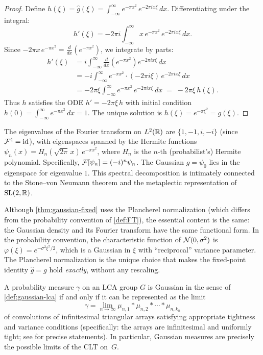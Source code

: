 \begin{proof}
Define $h(\xi) = \hat{g}(\xi) = \int_{-\infty}^{\infty} e^{-\pi x^2}\, e^{-2\pi i x\xi}\, dx$. Differentiating under the integral:
\[
h'(\xi) = -2\pi i \int_{-\infty}^{\infty} x\, e^{-\pi x^2}\, e^{-2\pi i x\xi}\, dx.
\]
Since $-2\pi x\, e^{-\pi x^2} = \frac{d}{dx}\!\left(e^{-\pi x^2}\right)$, we integrate by parts:
\begin{align*}
h'(\xi) &= i \int_{-\infty}^{\infty} \frac{d}{dx}\!\left(e^{-\pi x^2}\right) e^{-2\pi i x\xi}\, dx \\
&= -i \int_{-\infty}^{\infty} e^{-\pi x^2} \cdot (-2\pi i\xi)\, e^{-2\pi i x\xi}\, dx \\
&= -2\pi\xi \int_{-\infty}^{\infty} e^{-\pi x^2}\, e^{-2\pi i x\xi}\, dx \;=\; -2\pi\xi\, h(\xi).
\end{align*}
Thus $h$ satisfies the ODE $h' = -2\pi\xi\, h$ with initial condition $h(0) = \int_{-\infty}^{\infty} e^{-\pi x^2}\, dx = 1$. The unique solution is $h(\xi) = e^{-\pi\xi^2} = g(\xi)$.
\end{proof}

\begin{remark}\label{rmk:eigenvalues}
The eigenvalues of the Fourier transform on $L^2(\mathbb{R})$ are $\{1, -1, i, -i\}$ (since $\mathcal{F}^4 = \mathrm{id}$), with eigenspaces spanned by the Hermite functions $\psi_n(x) = H_n(\sqrt{2\pi}\, x)\, e^{-\pi x^2}$, where $H_n$ is the $n$-th (probabilist's) Hermite polynomial. Specifically, $\mathcal{F}[\psi_n] = (-i)^n \psi_n$. The Gaussian $g = \psi_0$ lies in the eigenspace for eigenvalue $1$. This spectral decomposition is intimately connected to the Stone--von Neumann theorem and the metaplectic representation of $\mathrm{SL}(2, \mathbb{R})$.
\end{remark}

\begin{remark}\label{rmk:convention-bridge}
Although \cref{thm:gaussian-fixed} uses the Plancherel normalization (which differs from the probability convention of \cref{def:FT}), the essential content is the same: the Gaussian density and its Fourier transform have the same functional form. In the probability convention, the characteristic function of $\mathcal{N}(0, \sigma^2)$ is $\varphi(\xi) = e^{-\sigma^2\xi^2/2}$, which is a Gaussian in $\xi$ with ``reciprocal'' variance parameter. The Plancherel normalization is the unique choice that makes the fixed-point identity $\hat{g} = g$ hold \emph{exactly}, without any rescaling.
\end{remark}

\begin{proposition}\label{prop:gaussian-characterization}
A probability measure $\gamma$ on an LCA group $G$ is Gaussian in the sense of \cref{def:gaussian-lca} if and only if it can be represented as the limit
\[
\gamma = \lim_{n \to \infty} \mu_{n,1} * \mu_{n,2} * \cdots * \mu_{n,k_n}
\]
of convolutions of infinitesimal triangular arrays satisfying appropriate tightness and variance conditions (specifically: the arrays are infinitesimal and uniformly tight; see \cite[Definition~VI.5.1]{Parthasarathy} for precise statements). In particular, Gaussian measures are precisely the possible limits of the CLT on~$G$.
\end{proposition}

